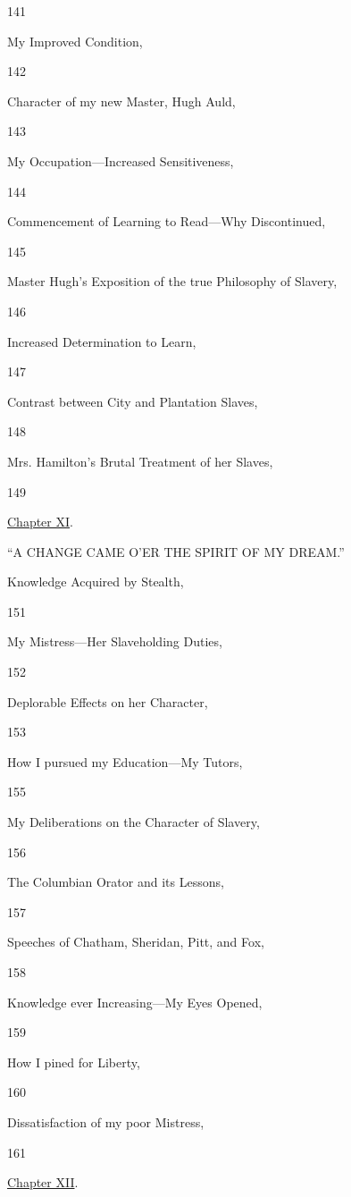 141

My Improved Condition,

142

Character of my new Master, Hugh Auld,

143

My Occupation---Increased Sensitiveness,

144

Commencement of Learning to Read---Why Discontinued,

145

Master Hugh's Exposition of the true Philosophy of Slavery,

146

Increased Determination to Learn,

147

Contrast between City and Plantation Slaves,

148

Mrs. Hamilton's Brutal Treatment of her Slaves,

149

\href{/wiki/My_Bondage_and_My_Freedom_(1855)/Chapter_XI}{Chapter XI}.

``A CHANGE CAME O'ER THE SPIRIT OF MY DREAM.''

Knowledge Acquired by Stealth,

151

My Mistress---Her Slaveholding Duties,

152

Deplorable Effects on her Character,

153

How I pursued my Education---My Tutors,

155

My Deliberations on the Character of Slavery,

156

The Columbian Orator and its Lessons,

157

Speeches of Chatham, Sheridan, Pitt, and Fox,

158

Knowledge ever Increasing---My Eyes Opened,

159

How I pined for Liberty,

160

Dissatisfaction of my poor Mistress,

161

\href{/wiki/My_Bondage_and_My_Freedom_(1855)/Chapter_XII}{Chapter XII}.

